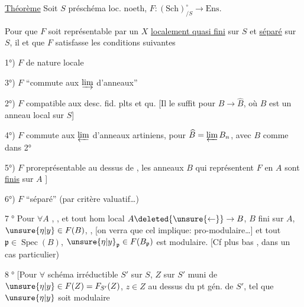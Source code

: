 \uline{Théorème} Soit $S$ préschéma loc. noeth, $F:(\mathrm{Sch})_{/S}^{\circ}\to\mathrm{Ens}$.

Pour que $F$ soit représentable par un $X$ \uline{localement quasi fini} sur $S$ et \uline{séparé} sur $S$, il  et  que $F$ satisfasse les conditions suivantes

1°) $F$ de nature locale

3°) $F$ ``commute aux $\varinjlim$ d'anneaux''

2°) $F$ compatible aux desc. fid. plts et qu. 
[Il le suffit pour $B\to\widehat B$, où $B$ est un anneau local  sur $S$] 

4°) $F$ commute aux $\varprojlim$ d'anneaux artiniens, pour $\widehat B=\varprojlim B_n$, avec $B$ comme dans 2°

5°) $F$ proreprésentable au dessus de ,  les anneaux $B$ qui représentent $F$ en $A$ sont \uline{finis} sur $A$ ]

6°) $F$ ``séparé'' (par critère valuatif\ldots)

\textcircled{7°} Pour  $\forall A$ , , et tout hom local $A\deleted{\unsure{\leftarrow}}\to B$, $B$ fini sur $A$,  $\unsure{\eta|y}\in F(B)$, ,  [on verra que cel implique: pro-modulaire\ldots] et tout $\mathfrak p\in\operatorname{Spec}(B)$, $\unsure{\eta|y}_{\mathfrak p}\in F(B_{\mathfrak p})$ est modulaire. [Cf plus bas , dans un cas particulier)

\textcircled{8°} [Pour $\forall$  schéma   irréductible $S'$ sur $S$,   $Z$ sur $S'$ muni de $\unsure{\eta|y}\in F(Z)=F_{S'}(Z)$, $z\in Z$ au dessus du pt gén. de $S'$, tel que $\unsure{\eta|y}$ soit modulaire


